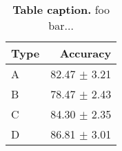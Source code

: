 \begin{table}[ht]
\centering
\begin{tabular}{@{}lr@{}}
  \toprule
  Type & Accuracy\\ \midrule
  A    & 82.47 $\pm$ 3.21 \\
  B    & 78.47 $\pm$ 2.43 \\
  C    & 84.30 $\pm$ 2.35 \\
  D    & 86.81 $\pm$ 3.01 \\
  \bottomrule
\end{tabular}

    \caption[Table caption]{\textbf{Table caption.} foo bar...\\}
    \label{tab:accuracy}
\end{table}